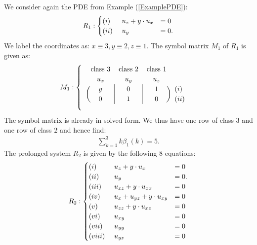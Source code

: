 \begin{example}
We consider again the PDE from Example (\ref{ExamplePDE}):
\begin{align}
    R_1 : \begin{cases} (i)\hphantom{i} \ \ \ \ u_z + y \cdot u_x &= 0\\
                        (ii) \ \ \ \ u_y &= 0.
            \end{cases}
\end{align}
We label the coordinates as: $x \equiv 3, y \equiv 2, z \equiv 1$. The symbol matrix $M_1$ of $R_1$ is given as:
\begin{align}
M_1 : \begin{cases}
\ \ 
\begin{blockarray}{cccc}
\text{class 3} & \text{class 2} & \text{class 1} \\
u_x & u_y & u_z \\
\begin{block}{(c|c|c)l}
  y & 0 & 1 & (i) \\
  0 & 1 & 0 & (ii) \\
\end{block}
\end{blockarray}
\end{cases}
\end{align}
The symbol matrix is already in solved form. We thus have one row of class $3$ and one row of class $2$ and hence find:
\begin{align}
  \sum_{k=1}^3 k\beta_1(k) = 5.  
\end{align}
The prolonged system $R_2$ is given by the following $8$ equations:
\begin{align}
    R_2 : \begin{cases} (i)\hphantom{vii} \ \ \ \   u_z + y \cdot u_x &= 0 \\
                        (ii)\hphantom{vi} \ \ \ \  u_y &= 0. \\
                        (iii)\hphantom{v} \ \ \ \  u_{xz} + y \cdot u_{xx} &= 0 \\
                        (iv)\hphantom{ii} \ \ \ \  u_x + u_{yz} + y \cdot u_{xy} &= 0 \\
                        (v)\hphantom{iii} \ \ \ \  u_{zz} + y \cdot u_{xz} &= 0 \\
                        (vi)\hphantom{ii} \ \ \ \ u_{xy} &= 0 \\
                        (vii)\hphantom{i} \ \ \ \ u_{yy} &= 0 \\
                        (viii) \ \ \ \ u_{yz} &= 0 

\end{cases}
\end{align}
\end{example}
